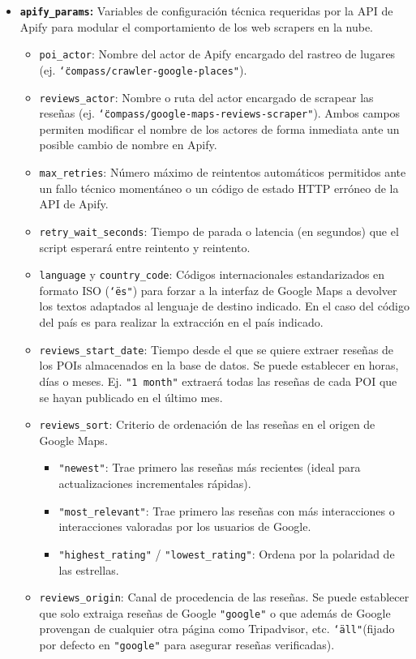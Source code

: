 \begin{itemize}
    \item \textbf{\texttt{apify\_params}:}
    Variables de configuración técnica requeridas por la API de Apify para modular el comportamiento de los web scrapers en la nube.
    \begin{itemize}
        \item \texttt{poi\_actor}: Nombre del actor de Apify encargado del rastreo de lugares (ej. \texttt{\char`\"compass/crawler-google-places"}).
        \item \texttt{reviews\_actor}: Nombre o ruta del actor encargado de scrapear las reseñas (ej. \texttt{\char`\"compass/google-maps-reviews-scraper"}). Ambos campos permiten modificar el nombre de los actores de forma inmediata ante un posible cambio de nombre en Apify.
        \item \texttt{max\_retries}: Número máximo de reintentos automáticos permitidos ante un fallo técnico momentáneo o un código de estado HTTP erróneo de la API de Apify.
        \item \texttt{retry\_wait\_seconds}: Tiempo de parada o latencia (en segundos) que el script esperará entre reintento y reintento.
        \item \texttt{language} y \texttt{country\_code}: Códigos internacionales estandarizados en formato ISO (\texttt{\char`\"es"}) para forzar a la interfaz de Google Maps a devolver los textos adaptados al lenguaje de destino indicado. En el caso del código del país es para realizar la extracción en el país indicado.
        \item \texttt{reviews\_start\_date}: Tiempo desde el que se quiere extraer reseñas de los POIs almacenados en la base de datos. Se puede establecer en horas, días o meses. Ej. \texttt{"1 month"} extraerá todas las reseñas de cada POI que se hayan publicado en el último mes.
        \item \texttt{reviews\_sort}: Criterio de ordenación de las reseñas en el origen de Google Maps.
        \begin{itemize}
            \item \texttt{"newest"}: Trae primero las reseñas más recientes (ideal para actualizaciones incrementales rápidas).
            \item \texttt{"most\_relevant"}: Trae primero las reseñas con más interacciones o interacciones valoradas por los usuarios de Google.
            \item \texttt{"highest\_rating"} / \texttt{"lowest\_rating"}: Ordena por la polaridad de las estrellas.
        \end{itemize}
        \item \texttt{reviews\_origin}: Canal de procedencia de las reseñas. Se puede establecer que solo extraiga reseñas de Google \texttt{"google"} o que además de Google provengan de cualquier otra página como Tripadvisor, etc. \texttt{\char`\"all"}(fijado por defecto en \texttt{"google"} para asegurar reseñas verificadas).
    \end{itemize}


\end{itemize}
